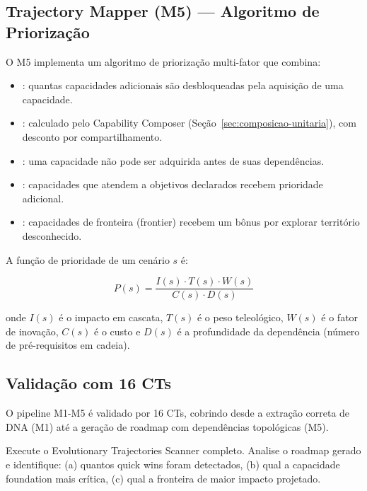 \subsection{Trajectory Mapper (M5) --- Algoritmo de Priorização}

O M5 implementa um algoritmo de priorização multi-fator que combina:

\begin{itemize}
\item {}: quantas capacidades adicionais são
desbloqueadas pela aquisição de uma capacidade.
\item {}: calculado pelo Capability Composer
(Seção~\ref{sec:composicao-unitaria}), com desconto por compartilhamento.
\item {}: uma capacidade não pode ser
adquirida antes de suas dependências.
\item {}: capacidades que atendem a objetivos
declarados recebem prioridade adicional.
\item {}: capacidades de fronteira (frontier)
recebem um bônus por explorar território desconhecido.
\end{itemize}

A função de prioridade de um cenário $s$ é:

\begin{equation}
P(s) = \frac{I(s) \cdot T(s) \cdot W(s)}{C(s) \cdot D(s)}
\end{equation}

onde $I(s)$ é o impacto em cascata, $T(s)$ é o peso teleológico, $W(s)$
é o fator de inovação, $C(s)$ é o custo e $D(s)$ é a profundidade da
dependência (número de pré-requisitos em cadeia).

\subsection{Validação com 16 CTs}

O pipeline M1-M5 é validado por 16 CTs, cobrindo desde a extração correta
de DNA (M1) até a geração de roadmap com dependências topológicas (M5).

\begin{exercicio}
Execute o Evolutionary Trajectories Scanner completo. Analise o roadmap
gerado e identifique: (a) quantos quick wins foram detectados, (b) qual
a capacidade foundation mais crítica, (c) qual a fronteira de maior
impacto projetado.
\end{exercicio}

